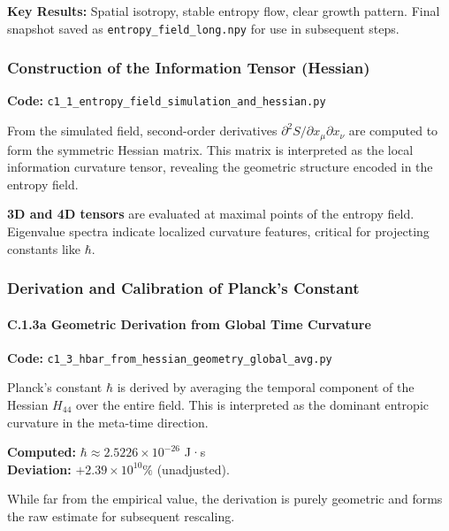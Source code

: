 \documentclass[10.5pt,a4paper]{article}
\begin{document}
\medskip

\noindent\textbf{Key Results:} Spatial isotropy, stable entropy flow, clear growth pattern. Final snapshot saved as \texttt{entropy\_field\_long.npy} for use in subsequent steps.

\subsubsection{Construction of the Information Tensor (Hessian)}

\noindent\textbf{Code:} \texttt{c1\_1\_entropy\_field\_simulation\_and\_hessian.py}

From the simulated field, second-order derivatives \( \partial^2 S / \partial x_\mu \partial x_\nu \) are computed to form the symmetric Hessian matrix. This matrix is interpreted as the local information curvature tensor, revealing the geometric structure encoded in the entropy field.

\medskip

\noindent\textbf{3D and 4D tensors} are evaluated at maximal points of the entropy field. Eigenvalue spectra indicate localized curvature features, critical for projecting constants like \( \hbar \).

\subsubsection{Derivation and Calibration of Planck’s Constant}

\paragraph{C.1.3a Geometric Derivation from Global Time Curvature}

\noindent\textbf{Code:} \texttt{c1\_3\_hbar\_from\_hessian\_geometry\_global\_avg.py}

Planck's constant \( \hbar \) is derived by averaging the temporal component of the Hessian \( H_{44} \) over the entire field. This is interpreted as the dominant entropic curvature in the meta-time direction.

\medskip

\noindent\textbf{Computed:} \( \hbar \approx 2.5226 \times 10^{-26} \) J·s\\
\textbf{Deviation:} \(+2.39 \times 10^{10}\%\) (unadjusted).

While far from the empirical value, the derivation is purely geometric and forms the raw estimate for subsequent rescaling.
\end{document}

